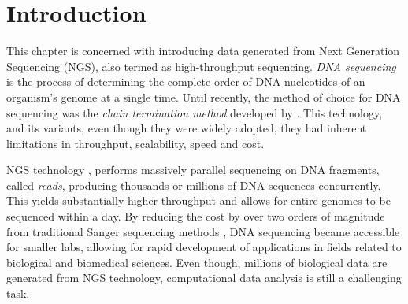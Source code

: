 \section{Introduction} \label{data-intro-sect}
This chapter is concerned with introducing data generated from Next Generation Sequencing (NGS), also termed as high-throughput sequencing. \emph{DNA sequencing} is the process of determining the complete order of DNA nucleotides of an organism's genome at a single time. Until recently, the method of choice for DNA sequencing was the \emph{chain termination method} developed by \citet{Sanger1977}. This technology, and its variants, even though they were widely adopted, they had inherent limitations in throughput, scalability, speed and cost. 

NGS technology \citep{Shendure2008, Mardis2008}, performs massively parallel sequencing on DNA fragments, called \emph{reads}, producing thousands or millions of DNA sequences concurrently. This yields substantially higher throughput and allows for entire genomes to be sequenced within a day. By reducing the cost by over two orders of magnitude from traditional Sanger sequencing methods \citep{Shendure2008}, DNA sequencing became accessible for smaller labs, allowing for rapid development of applications in fields related to biological and biomedical sciences. Even though, millions of biological data are generated from NGS technology, computational data analysis is still a challenging task.